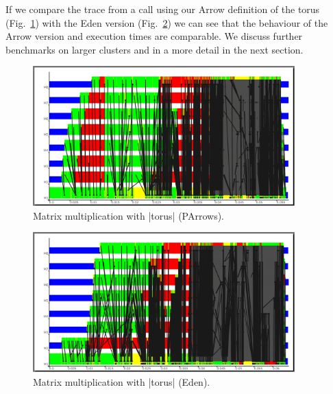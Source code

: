 If we compare the trace from a call using our Arrow definition of the torus (Fig.~\ref{fig:torus_parrows_trace}) with the Eden version (Fig.~\ref{fig:torus_eden_trace}) we can see that the behaviour of the Arrow version and execution times are comparable. We discuss further benchmarks on larger clusters and in a more detail in the next section.
\begin{figure}[tb]
	\centering
	\includegraphics[width=0.9\textwidth]{images/torus_matrix_parrows_scale}
	\caption[Matrix multiplication with |torus| (PArrows)]{Matrix multiplication with |torus| (PArrows).}
	\label{fig:torus_parrows_trace}
\end{figure}

\begin{figure}[tb]
	\centering
	\includegraphics[width=0.9\textwidth]{images/torus_matrix_eden_scale}
	\caption[Matrix multiplication with |torus| (Eden)]{Matrix multiplication with |torus| (Eden).}
	\label{fig:torus_eden_trace}
\end{figure}


